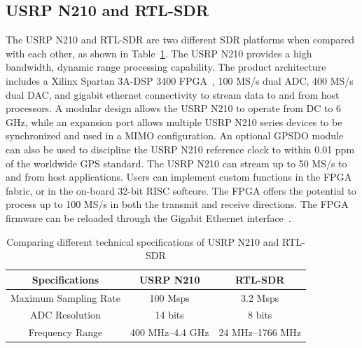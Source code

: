\subsection{USRP N210 and RTL-SDR}
The USRP N210 and RTL-SDR are two different SDR platforms when compared with each other, as shown in Table~\ref{usrprtl}. The USRP N210 provides a high bandwidth, dynamic range processing capability. The product architecture includes a Xilinx Spartan 3A-DSP 3400 FPGA~\cite{xilinx}, 100 MS/s dual ADC, 400 MS/s dual DAC, and gigabit ethernet connectivity to stream data to and from host processors. A modular design allows the USRP N210 to operate from DC to 6 GHz, while an expansion port allows multiple USRP N210 series devices to be synchronized and used in a MIMO configuration. An optional GPSDO module can also be used to discipline the USRP N210 reference clock to within 0.01 ppm of the worldwide GPS standard. The USRP N210 can stream up to 50 MS/s to and from host applications. Users can implement custom functions in the FPGA fabric, or in the on-board 32-bit RISC softcore. The FPGA offers the potential to process up to 100 MS/s in both the transmit and receive directions. The FPGA firmware can be reloaded through the Gigabit Ethernet interface~\cite{usrp}.

\begin{table}[!ht]
\caption{Comparing different technical specifications of USRP N210 and RTL-SDR}
\centering
\begin{tabular}{| c | c | c |}
\toprule
Specifications  & USRP N210 & RTL-SDR \\
\midrule
Maximum Sampling Rate  & 100 Msps  & 3.2 Msps\\ 
ADC Resolution  & 14 bits  & 8 bits\\ 
Frequency Range  & 400 MHz--4.4 GHz  & 24 MHz--1766 MHz\\
\bottomrule
\end{tabular}
\label{usrprtl}
\end{table}

